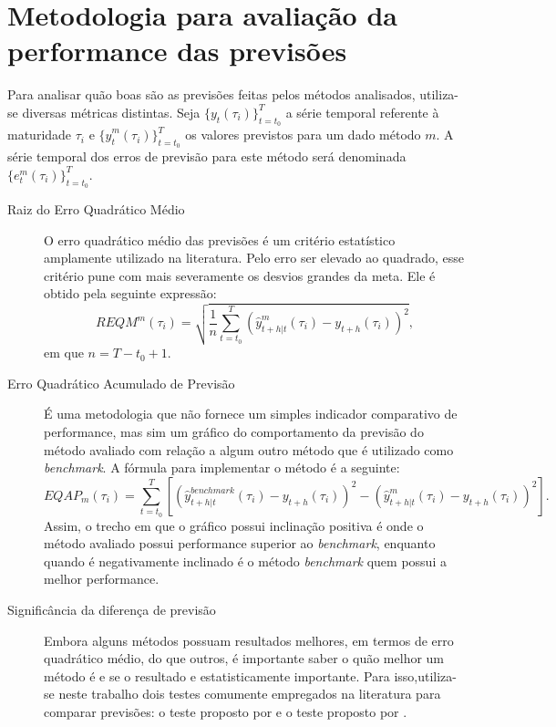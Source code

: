 \documentclass[
	12pt,				%
	openright,			%
	oneside,			%
	a4paper,			%
	english,			%
	brazil				%
	]{dissertacao-ufrgs-abntex2}
\begin{document}
\section{Metodologia para avaliação da performance das previsões} \label{sub:avaliacao}

Para analisar quão boas são as previsões feitas pelos métodos analisados, utiliza-se diversas métricas distintas. Seja $\{y_{t}(\tau_i)\}_{t=t_0}^T$ a série temporal referente à maturidade $\tau_i$ e $\{\hat{y}_{t}^m(\tau_i)\}_{t=t_0}^T$ os valores previstos para um dado método $m$. A série temporal dos erros de previsão para este método será denominada $\{e_{t}^m(\tau_i)\}_{t=t_0}^T$.

\begin{description}
	\item[Raiz do Erro Quadrático Médio] O erro quadrático médio das previsões é um critério estatístico amplamente utilizado na literatura. Pelo erro ser elevado ao quadrado, esse critério pune com mais severamente os desvios grandes da meta. Ele é obtido pela seguinte expressão: \[ REQM^m(\tau_i) = \sqrt{ \frac{1}{n} \sum _{t = t_0}^T (\hat{y}_{t+h|t}^m(\tau_i) - y_{t+h}(\tau_i))^2 }, \]
	em que $n = T - t_0 + 1$.
	\item[Erro Quadrático Acumulado de Previsão] É uma metodologia que não fornece um simples indicador comparativo de performance, mas sim um gráfico do comportamento da previsão do método avaliado com relação a algum outro método que é utilizado como \emph{benchmark}. A fórmula para implementar o método é a seguinte:
	\[ EQAP_{m}(\tau_i) = \sum_{t=t_0}^T  \left[ \left( \hat{y}_{t+h|t}^{benchmark}(\tau_i) - y_{t+h}(\tau_i) \right)^2 - \left( \hat{y}_{t+h|t}^m(\tau_i) - y_{t+h}(\tau_i) \right)^2 \right]. \]
Assim, o trecho em que o gráfico possui inclinação positiva é onde o método avaliado possui performance superior ao \emph{benchmark}, enquanto quando é negativamente inclinado é o método \emph{benchmark} quem possui a melhor performance.

	\item[Significância da diferença de previsão]

Embora alguns métodos possuam resultados melhores, em termos de erro quadrático médio, do que outros, é importante saber o quão melhor um método é e se o resultado e estatisticamente importante. 
Para isso,utiliza-se neste trabalho dois testes comumente empregados na literatura para comparar previsões: o teste proposto por  e o teste proposto por .


\end{description}
\end{document}
